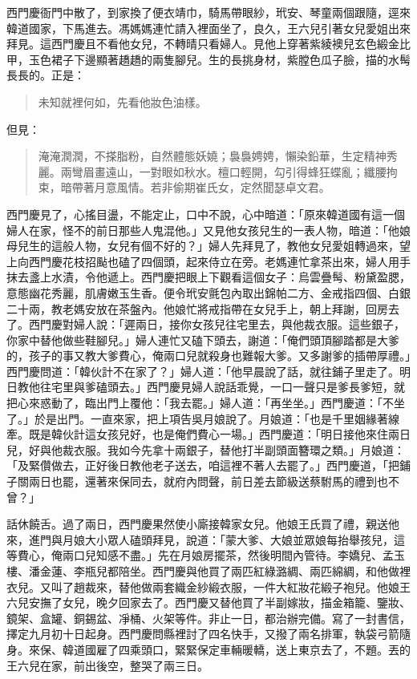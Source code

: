 西門慶衙門中散了，到家換了便衣靖巾，騎馬帶眼紗，玳安、琴童兩個跟隨，逕來韓道國家，下馬進去。馮媽媽連忙請入裡面坐了，良久，王六兒引著女兒愛姐出來拜見。這西門慶且不看他女兒，不轉晴只看婦人。見他上穿著紫綾襖兒玄色緞金比甲，玉色裙子下邊顯著趫趫的兩隻腳兒。生的長挑身材，紫膛色瓜子臉，描的水髩長長的。正是：
\begin{quote}
未知就裡何如，先看他妝色油樣。
\end{quote}
但見：
\begin{quote}
淹淹潤潤，不搽脂粉，自然體態妖嬈；裊裊娉娉，懶染鉛華，生定精神秀麗。兩彎眉畫遠山，一對眼如秋水。檀口輕開，勾引得蜂狂蝶亂；纖腰拘束，暗帶著月意風情。若非偷期崔氏女，定然聞瑟卓文君。
\end{quote}

西門慶見了，心搖目盪，不能定止，口中不說，心中暗道：「原來韓道國有這一個婦人在家，怪不的前日那些人鬼混他。」又見他女孩兒生的一表人物，暗道：「他娘母兒生的這般人物，女兒有個不好的？」婦人先拜見了，教他女兒愛姐轉過來，望上向西門慶花枝招颭也磕了四個頭，起來侍立在旁。老媽連忙拿茶出來，婦人用手抹去盞上水漬，令他遞上。西門慶把眼上下觀看這個女子：烏雲疊髩、粉黛盈腮，意態幽花秀麗，肌膚嫩玉生香。便令玳安氈包內取出錦帕二方、金戒指四個、白銀二十兩，教老媽安放在茶盤內。他娘忙將戒指帶在女兒手上，朝上拜謝，回房去了。西門慶對婦人說：「遲兩日，接你女孩兒往宅里去，與他裁衣服。這些銀子，你家中替他做些鞋腳兒。」婦人連忙又磕下頭去，謝道：「俺們頭頂腳踏都是大爹的，孩子的事又教大爹費心，俺兩口兒就殺身也難報大爹。又多謝爹的插帶厚禮。」西門慶問道：「韓伙計不在家了？」婦人道：「他早晨說了話，就往鋪子里走了。明日教他往宅里與爹磕頭去。」西門慶見婦人說話乖覺，一口一聲只是爹長爹短，就把心來惑動了，臨出門上覆他：「我去罷。」婦人道：「再坐坐。」西門慶道：「不坐了。」於是出門。一直來家，把上項告吳月娘說了。月娘道：「也是千里姻緣著線牽。既是韓伙計這女孩兒好，也是俺們費心一場。」西門慶道：「明日接他來住兩日兒，好與他裁衣服。我如今先拿十兩銀子，替他打半副頭面簪環之類。」月娘道：「及緊儹做去，正好後日教他老子送去，咱這裡不著人去罷了。」西門慶道，「把鋪子關兩日也罷，還著來保同去，就府內問聲，前日差去節級送蔡駙馬的禮到也不曾？」

話休饒舌。過了兩日，西門慶果然使小廝接韓家女兒。他娘王氏買了禮，親送他來，進門與月娘大小眾人磕頭拜見，說道：「蒙大爹、大娘並眾娘每抬舉孩兒，這等費心，俺兩口兒知感不盡。」先在月娘房擺茶，然後明間內管待。李嬌兒、孟玉樓、潘金蓮、李瓶兒都陪坐。西門慶與他買了兩匹紅綠潞綢、兩匹綿綢，和他做裡衣兒。又叫了趙裁來，替他做兩套織金紗緞衣服，一件大紅妝花緞子袍兒。他娘王六兒安撫了女兒，晚夕回家去了。西門慶又替他買了半副嫁妝，描金箱籠、鑒妝、鏡架、盒罐、銅錫盆、凈桶、火架等件。非止一日，都治辦完備。寫了一封書信，擇定九月初十日起身。西門慶問縣裡討了四名快手，又撥了兩名排軍，執袋弓箭隨身。來保、韓道國雇了四乘頭口，緊緊保定車輛暖轎，送上東京去了，不題。丟的王六兒在家，前出後空，整哭了兩三日。

